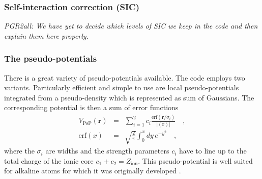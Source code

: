 \documentclass[final,1p]{elsarticle}
\newcommand{\PGRcomm}[1]{{\color{blue}\small\em PGR2all: #1}}
\begin{document}
\subsubsection{Self-interaction correction (SIC)}
\label{sec:SIC}

\PGRcomm{We have yet to decide which levels of SIC we keep in the code
and then explain them here properly.}

\subsubsection{The pseudo-potentials}
\label{sec:practPsP}

There is a great variety of pseudo-potentials available.  The code
employs two variants. Particularly efficient and simple to use are
local pseudo-potentials integrated from a pseudo-density which is
represented as sum of Gaussians.  The corresponding potential is then
a sum of error functions
\begin{subequations}
\begin{eqnarray}
  V_\mathrm{PsP}(\mathbf{r})
  &=&
  \sum_{i=1}^2 c_i \frac{\mbox{erf}(\mathbf{r}/\sigma_i)}{|(\mathbf{r})|}
  \quad,
\label{eq:locPsP}
\\
  \mbox{erf}(x) 
  &=&
  \sqrt{\frac{2}{\pi}}\int_0^x dy\,e^{-y^2}
  \quad,
\label{eq:erf}
\end{eqnarray}
\end{subequations}
where the $\sigma_i$ are widths and the strength parameters $c_i$ have
to line up to the total charge of the ionic core
$c_1+c_2=Z_\mathrm{ion}$. This pseudo-potential is well suited for
alkaline atoms for which it was originally developed \cite{Kue99}.
\end{document}
